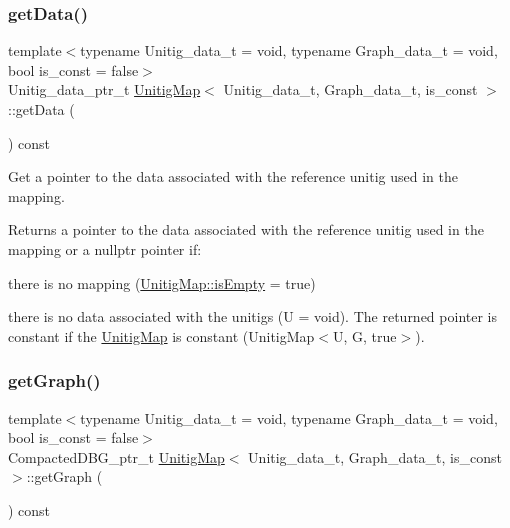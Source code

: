 \subsubsection{\texorpdfstring{get\+Data()}{getData()}}
{\footnotesize\ttfamily template$<$typename Unitig\+\_\+data\+\_\+t = void, typename Graph\+\_\+data\+\_\+t = void, bool is\+\_\+const = false$>$ \\
Unitig\+\_\+data\+\_\+ptr\+\_\+t \hyperlink{classUnitigMap}{Unitig\+Map}$<$ Unitig\+\_\+data\+\_\+t, Graph\+\_\+data\+\_\+t, is\+\_\+const $>$\+::get\+Data (\begin{DoxyParamCaption}{ }\end{DoxyParamCaption}) const}



Get a pointer to the data associated with the reference unitig used in the mapping. 

\begin{DoxyReturn}{Returns}
a pointer to the data associated with the reference unitig used in the mapping or a nullptr pointer if\+:
\begin{DoxyItemize}
\item there is no mapping (\hyperlink{structUnitigMapBase_ade629940b2611494dbf233cb1144da80}{Unitig\+Map\+::is\+Empty} = true)
\item there is no data associated with the unitigs (U = void). The returned pointer is constant if the \hyperlink{classUnitigMap}{Unitig\+Map} is constant (Unitig\+Map$<$\+U, G, true$>$). 
\end{DoxyItemize}
\end{DoxyReturn}
\mbox{\label{classUnitigMap_ab6bc6b4a479bef4a7cb9c72806679f5e}} 
\subsubsection{\texorpdfstring{get\+Graph()}{getGraph()}}
{\footnotesize\ttfamily template$<$typename Unitig\+\_\+data\+\_\+t = void, typename Graph\+\_\+data\+\_\+t = void, bool is\+\_\+const = false$>$ \\
Compacted\+D\+B\+G\+\_\+ptr\+\_\+t \hyperlink{classUnitigMap}{Unitig\+Map}$<$ Unitig\+\_\+data\+\_\+t, Graph\+\_\+data\+\_\+t, is\+\_\+const $>$\+::get\+Graph (\begin{DoxyParamCaption}{ }\end{DoxyParamCaption}) const\hspace{0.3cm}{\ttfamily [inline]}}



